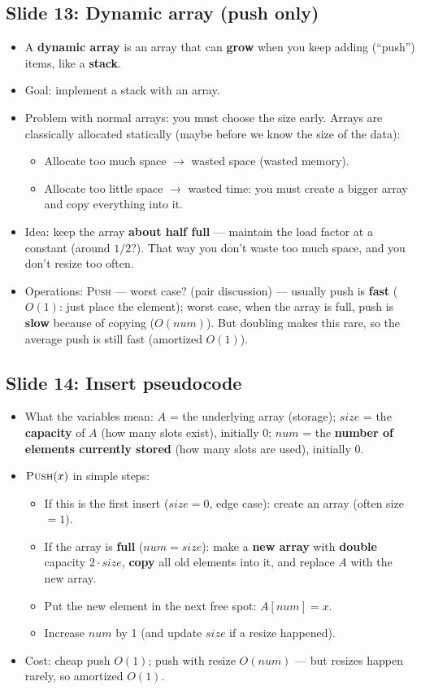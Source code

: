 \documentclass[11pt]{article}
\newcommand{\slide}[2]{\subsection*{Slide #1: #2}}
\begin{document}
\slide{13}{Dynamic array (push only)}
\begin{itemize}
  \item A \textbf{dynamic array} is an array that can \textbf{grow} when you keep adding (``push'') items, like a \textbf{stack}.
  \item Goal: implement a stack with an array.
  \item Problem with normal arrays: you must choose the size early. Arrays are classically allocated statically (maybe before we know the size of the data):
  \begin{itemize}
    \item Allocate too much space $\to$ wasted space (wasted memory).
    \item Allocate too little space $\to$ wasted time: you must create a bigger array and copy everything into it.
  \end{itemize}
  \item Idea: keep the array \textbf{about half full} --- maintain the load factor at a constant (around $1/2$?). That way you don't waste too much space, and you don't resize too often.
  \item Operations: \textsc{Push} --- worst case? \hfill (pair discussion) --- usually push is \textbf{fast} ($O(1)$: just place the element); worst case, when the array is full, push is \textbf{slow} because of copying ($O(num)$). But doubling makes this rare, so the average push is still fast (amortized $O(1)$).
\end{itemize}

\slide{14}{Insert pseudocode}
\begin{itemize}
  \item What the variables mean: $A$ = the underlying array (storage); $size$ = the \textbf{capacity} of $A$ (how many slots exist), initially 0; $num$ = the \textbf{number of elements currently stored} (how many slots are used), initially 0.
  \item $\textsc{Push}(x)$ in simple steps:
  \begin{itemize}
    \item If this is the first insert ($size = 0$, edge case): create an array (often size $= 1$).
    \item If the array is \textbf{full} ($num = size$): make a \textbf{new array} with \textbf{double} capacity $2 \cdot size$, \textbf{copy} all old elements into it, and replace $A$ with the new array.
    \item Put the new element in the next free spot: $A[num] = x$.
    \item Increase $num$ by 1 (and update $size$ if a resize happened).
  \end{itemize}
  \item Cost: cheap push $O(1)$; push with resize $O(num)$ --- but resizes happen rarely, so amortized $O(1)$.
\end{itemize}
\end{document}

